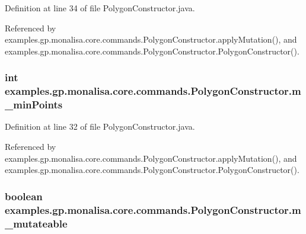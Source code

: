 Definition at line 34 of file Polygon\-Constructor.\-java.



Referenced by examples.\-gp.\-monalisa.\-core.\-commands.\-Polygon\-Constructor.\-apply\-Mutation(), and examples.\-gp.\-monalisa.\-core.\-commands.\-Polygon\-Constructor.\-Polygon\-Constructor().

\hypertarget{classexamples_1_1gp_1_1monalisa_1_1core_1_1commands_1_1_polygon_constructor_adb7092709701ab2fccb359ec5148095d}{
\subsubsection[{m\-\_\-min\-Points}]{\setlength{\rightskip}{0pt plus 5cm}int examples.\-gp.\-monalisa.\-core.\-commands.\-Polygon\-Constructor.\-m\-\_\-min\-Points\hspace{0.3cm}{\ttfamily [private]}}}\label{classexamples_1_1gp_1_1monalisa_1_1core_1_1commands_1_1_polygon_constructor_adb7092709701ab2fccb359ec5148095d}


Definition at line 32 of file Polygon\-Constructor.\-java.



Referenced by examples.\-gp.\-monalisa.\-core.\-commands.\-Polygon\-Constructor.\-apply\-Mutation(), and examples.\-gp.\-monalisa.\-core.\-commands.\-Polygon\-Constructor.\-Polygon\-Constructor().

\hypertarget{classexamples_1_1gp_1_1monalisa_1_1core_1_1commands_1_1_polygon_constructor_afc5d6f3dbd5dabe1fab8d50b04decc67}{
\subsubsection[{m\-\_\-mutateable}]{\setlength{\rightskip}{0pt plus 5cm}boolean examples.\-gp.\-monalisa.\-core.\-commands.\-Polygon\-Constructor.\-m\-\_\-mutateable\hspace{0.3cm}{\ttfamily [private]}}}\label{classexamples_1_1gp_1_1monalisa_1_1core_1_1commands_1_1_polygon_constructor_afc5d6f3dbd5dabe1fab8d50b04decc67}



